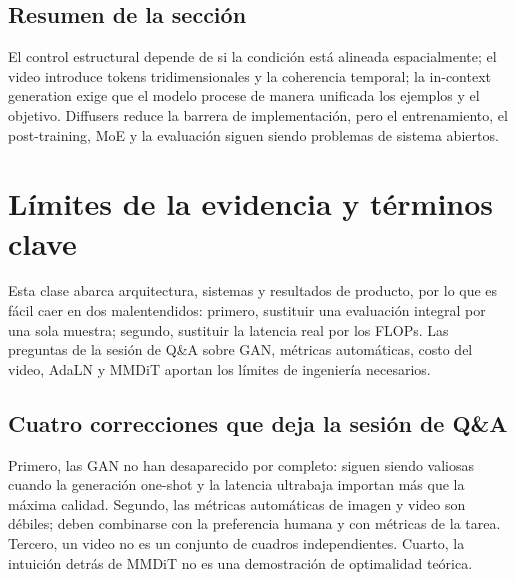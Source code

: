 \documentclass[a4paper]{article}
\begin{document}
\subsection{Resumen de la sección}

El control estructural depende de si la condición está alineada espacialmente; el video introduce tokens tridimensionales y la coherencia temporal; la in-context generation exige que el modelo procese de manera unificada los ejemplos y el objetivo. Diffusers reduce la barrera de implementación, pero el entrenamiento, el post-training, MoE y la evaluación siguen siendo problemas de sistema abiertos.
\section{Límites de la evidencia y términos clave}

Esta clase abarca arquitectura, sistemas y resultados de producto, por lo que es fácil caer en dos malentendidos: primero, sustituir una evaluación integral por una sola muestra; segundo, sustituir la latencia real por los FLOPs. Las preguntas de la sesión de Q\&A sobre GAN, métricas automáticas, costo del video, AdaLN y MMDiT aportan los límites de ingeniería necesarios.

\subsection{Cuatro correcciones que deja la sesión de Q\&A}

Primero, las GAN no han desaparecido por completo: siguen siendo valiosas cuando la generación one-shot y la latencia ultrabaja importan más que la máxima calidad. Segundo, las métricas automáticas de imagen y video son débiles; deben combinarse con la preferencia humana y con métricas de la tarea. Tercero, un video no es un conjunto de cuadros independientes. Cuarto, la intuición detrás de MMDiT no es una demostración de optimalidad teórica.


\end{document}
